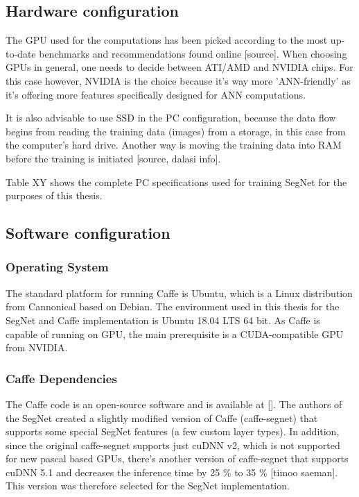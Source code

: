 \subsection{Hardware configuration}

The GPU used for the computations has been picked according to the most up-to-date benchmarks and recommendations found online [source]. When choosing GPUs in general, one needs to decide between ATI/AMD and NVIDIA chips. For this case however, NVIDIA is the choice because it's way more 'ANN-friendly' as it's offering more features specifically designed for ANN computations. 

It is also advisable to use SSD in the PC configuration, because the data flow begins from reading the training data (images) from a storage, in this case from the computer's hard drive. Another way is moving the training data into RAM before the training is initiated [source, dalasi info]. 

Table XY shows the complete PC specifications used for training SegNet for the purposes of this thesis.  

\subsection{Software configuration} 

\subsubsection{Operating System} 

The standard platform for running Caffe is Ubuntu, which is a Linux distribution from Cannonical based on Debian. The environment used in this thesis for the SegNet and Caffe implementation is Ubuntu 18.04 LTS 64 bit. As Caffe is capable of running on GPU, the main prerequisite is a CUDA-compatible GPU from NVIDIA. 

\subsubsection{Caffe Dependencies} 

The Caffe code is an open-source software and is available at []. The authors of the SegNet created a slightly modified version of Caffe (caffe-segnet) that supports some special SegNet features (a few custom layer types). In addition, since the original caffe-segnet supports just cuDNN v2, which is not supported for new pascal based GPUs, there's another version of caffe-segnet that supports cuDNN 5.1 and decreases the inference time by 25 \% to 35 \% [timoo saeman]. This version was therefore selected for the SegNet implementation.

